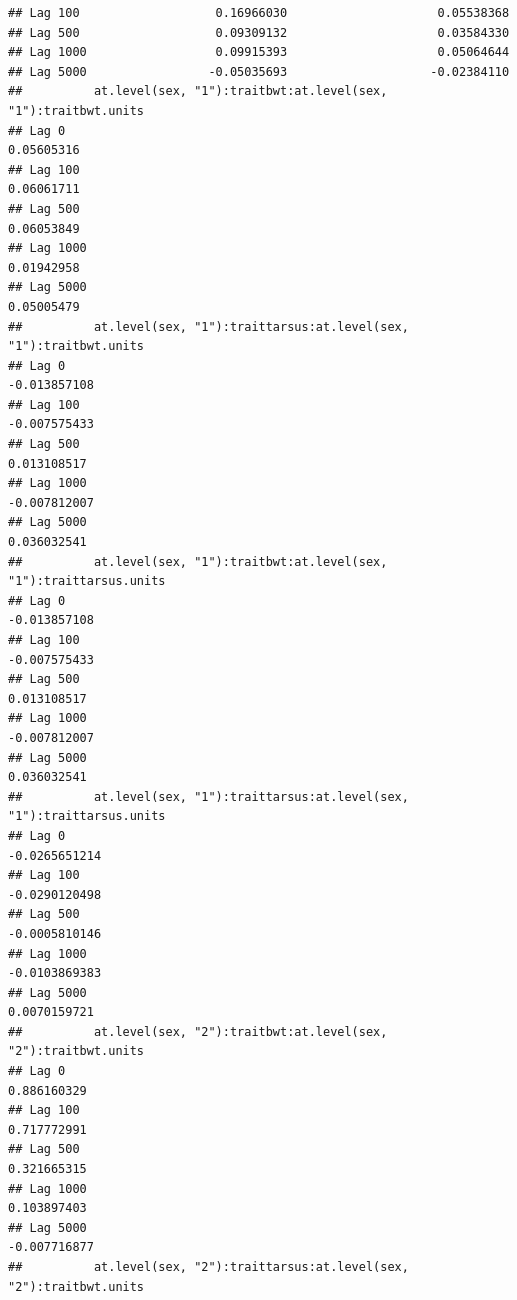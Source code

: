\documentclass[
  12pt,
]{book}
\begin{document}
\begin{verbatim}
## Lag 100                   0.16966030                     0.05538368
## Lag 500                   0.09309132                     0.03584330
## Lag 1000                  0.09915393                     0.05064644
## Lag 5000                 -0.05035693                    -0.02384110
##          at.level(sex, "1"):traitbwt:at.level(sex, "1"):traitbwt.units
## Lag 0                                                       0.05605316
## Lag 100                                                     0.06061711
## Lag 500                                                     0.06053849
## Lag 1000                                                    0.01942958
## Lag 5000                                                    0.05005479
##          at.level(sex, "1"):traittarsus:at.level(sex, "1"):traitbwt.units
## Lag 0                                                        -0.013857108
## Lag 100                                                      -0.007575433
## Lag 500                                                       0.013108517
## Lag 1000                                                     -0.007812007
## Lag 5000                                                      0.036032541
##          at.level(sex, "1"):traitbwt:at.level(sex, "1"):traittarsus.units
## Lag 0                                                        -0.013857108
## Lag 100                                                      -0.007575433
## Lag 500                                                       0.013108517
## Lag 1000                                                     -0.007812007
## Lag 5000                                                      0.036032541
##          at.level(sex, "1"):traittarsus:at.level(sex, "1"):traittarsus.units
## Lag 0                                                          -0.0265651214
## Lag 100                                                        -0.0290120498
## Lag 500                                                        -0.0005810146
## Lag 1000                                                       -0.0103869383
## Lag 5000                                                        0.0070159721
##          at.level(sex, "2"):traitbwt:at.level(sex, "2"):traitbwt.units
## Lag 0                                                      0.886160329
## Lag 100                                                    0.717772991
## Lag 500                                                    0.321665315
## Lag 1000                                                   0.103897403
## Lag 5000                                                  -0.007716877
##          at.level(sex, "2"):traittarsus:at.level(sex, "2"):traitbwt.units

\end{verbatim}
\end{document}
